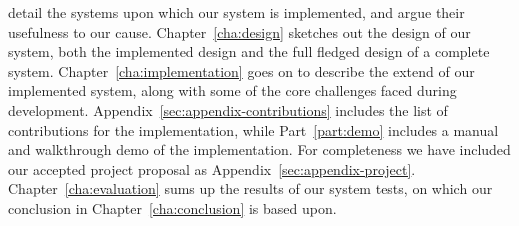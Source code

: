 detail the systems upon which our system is implemented, and argue their
usefulness to our cause.
Chapter~\ref{cha:design} sketches out the design of our system, both 
the implemented design and the full fledged design of a complete system.
Chapter~\ref{cha:implementation} goes on to describe the extend of our
implemented system, along with some of the core challenges faced during development.
Appendix~\ref{sec:appendix-contributions} includes the list of contributions
for the implementation,
while Part~\ref{part:demo} includes a manual and walkthrough demo of the implementation.
For completeness we have included our accepted project proposal as
Appendix~\ref{sec:appendix-project}.
Chapter~\ref{cha:evaluation} sums up the results of our system tests,
on which our conclusion in Chapter~\ref{cha:conclusion} is based upon.

